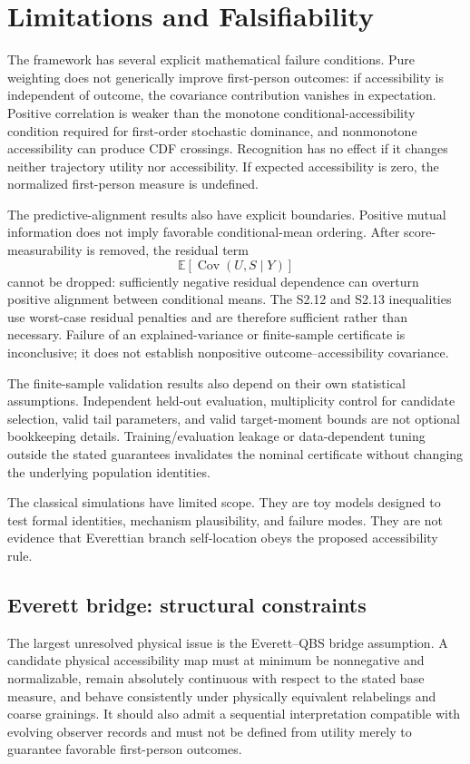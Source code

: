 \section{Limitations and Falsifiability}

The framework has several explicit mathematical failure conditions. Pure weighting does not generically improve first-person outcomes: if accessibility is independent of outcome, the covariance contribution vanishes in expectation. Positive correlation is weaker than the monotone conditional-accessibility condition required for first-order stochastic dominance, and nonmonotone accessibility can produce CDF crossings. Recognition has no effect if it changes neither trajectory utility nor accessibility. If expected accessibility is zero, the normalized first-person measure is undefined.

The predictive-alignment results also have explicit boundaries. Positive mutual information does not imply favorable conditional-mean ordering. After score-measurability is removed, the residual term
\[
\mathbb E[\operatorname{Cov}(U,S\mid Y)]
\]
cannot be dropped: sufficiently negative residual dependence can overturn positive alignment between conditional means. The S2.12 and S2.13 inequalities use worst-case residual penalties and are therefore sufficient rather than necessary. Failure of an explained-variance or finite-sample certificate is inconclusive; it does not establish nonpositive outcome--accessibility covariance.

The finite-sample validation results also depend on their own statistical assumptions. Independent held-out evaluation, multiplicity control for candidate selection, valid tail parameters, and valid target-moment bounds are not optional bookkeeping details. Training/evaluation leakage or data-dependent tuning outside the stated guarantees invalidates the nominal certificate without changing the underlying population identities.

The classical simulations have limited scope. They are toy models designed to test formal identities, mechanism plausibility, and failure modes. They are not evidence that Everettian branch self-location obeys the proposed accessibility rule.

\subsection{Everett bridge: structural constraints}

The largest unresolved physical issue is the Everett--QBS bridge assumption. A candidate physical accessibility map must at minimum be nonnegative and normalizable, remain absolutely continuous with respect to the stated base measure, and behave consistently under physically equivalent relabelings and coarse grainings. It should also admit a sequential interpretation compatible with evolving observer records and must not be defined from utility merely to guarantee favorable first-person outcomes.


